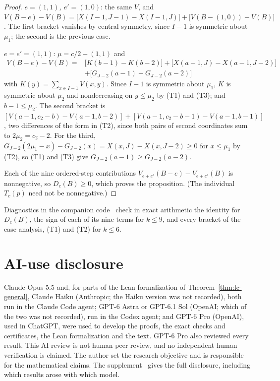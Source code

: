 \begin{proof}
\emph{$e=(1,1)$, $e'=(1,0)$}: the same $V$, and $V(B-e)-V(B)=\bigl[X(I-1,J-1)-X(I-1,J)\bigr]+\bigl[V(B-(1,0))-V(B)\bigr]$. The first bracket vanishes by central symmetry, since $I-1$ is symmetric about $\mu_1$; the second is the previous case.

\emph{$e=e'=(1,1)$}: $\mu=c/2-(1,1)$ and
\[
\begin{aligned}
V(B-e)-V(B)={}&\bigl[K(b-1)-K(b-2)\bigr]+\bigl[X(a-1,J)-X(a-1,J-2)\bigr]\\
&+\bigl[G_{J-2}(a-1)-G_{J-2}(a-2)\bigr]
\end{aligned}
\]
with $K(y)=\sum_{x\in I-1}V(x,y)$. Since $I-1$ is symmetric about $\mu_1$, $K$ is symmetric about $\mu_2$ and nondecreasing on $y\leq\mu_2$ by (T1) and (T3); and $b-1\leq\mu_2$. The second bracket is $[V(a-1,c_2-b)-V(a-1,b-2)]+[V(a-1,c_2-b-1)-V(a-1,b-1)]$, two differences of the form in (T2), since both pairs of second coordinates sum to $2\mu_2=c_2-2$. For the third, $G_{J-2}(2\mu_1-x)-G_{J-2}(x)=X(x,J)-X(x,J-2)\geq0$ for $x\leq\mu_1$ by (T2), so (T1) and (T3) give $G_{J-2}(a-1)\geq G_{J-2}(a-2)$.

Each of the nine ordered-step contributions $V_{e+e'}(B-e)-V_{e+e'}(B)$ is nonnegative, so $D_c(B)\geq0$, which proves the proposition. (The individual $T_c(p)$ need not be nonnegative.)
\end{proof}

Diagnostics in the companion code~\cite{code} check in exact arithmetic the identity for $D_c(B)$, the sign of each of its nine terms for $k\leq9$, and every bracket of the case analysis, (T1) and (T2) for $k\leq6$.

\section*{AI-use disclosure}

Claude Opus 5.5 and, for parts of the Lean formalization of Theorem~\ref{thm:lc-general}, Claude Haiku (Anthropic; the Haiku version was not recorded), both run in the Claude Code agent; GPT-6 Astra or GPT-6.1 Sol (OpenAI; which of the two was not recorded), run in the Codex agent; and GPT-6 Pro (OpenAI), used in ChatGPT, were used to develop the proofs, the exact checks and certificates, the Lean formalization and the text. GPT-6 Pro also reviewed every result. This AI review is not human peer review, and no independent human verification is claimed. The author set the research objective and is responsible for the mathematical claims. The supplement~\cite{supp} gives the full disclosure, including which results arose with which model.

